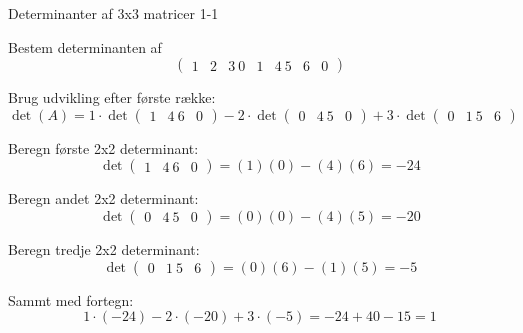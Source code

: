 \documentclass{article}
\begin{document}

\tableofcontents
\newpage

\begin{exercise}{Determinanter af 3x3 matricer 1-1}

Bestem determinanten af
\[
\begin{pmatrix}
1 & 2 & 3 \
0 & 1 & 4 \
5 & 6 & 0
\end{pmatrix}
\]


\hint

Brug udvikling efter første række:
\[
\det(A) = 1 \cdot \det \begin{pmatrix} 1 & 4 \ 6 & 0 \end{pmatrix} - 2 \cdot \det \begin{pmatrix} 0 & 4 \ 5 & 0 \end{pmatrix} + 3 \cdot \det \begin{pmatrix} 0 & 1 \ 5 & 6 \end{pmatrix}
\]

\hint

Beregn første 2x2 determinant:
\[
\det \begin{pmatrix} 1 & 4 \ 6 & 0 \end{pmatrix} = (1)(0) - (4)(6) = -24
\]

\hint

Beregn andet 2x2 determinant:
\[
\det \begin{pmatrix} 0 & 4 \ 5 & 0 \end{pmatrix} = (0)(0) - (4)(5) = -20
\]

\hint

Beregn tredje 2x2 determinant:
\[
\det \begin{pmatrix} 0 & 1 \ 5 & 6 \end{pmatrix} = (0)(6) - (1)(5) = -5
\]

\hint

Sammt med fortegn:
\[
1\cdot(-24) - 2\cdot(-20) + 3\cdot(-5) = -24 + 40 - 15 = 1
\]

\end{exercise}

\newpage
\end{document}
